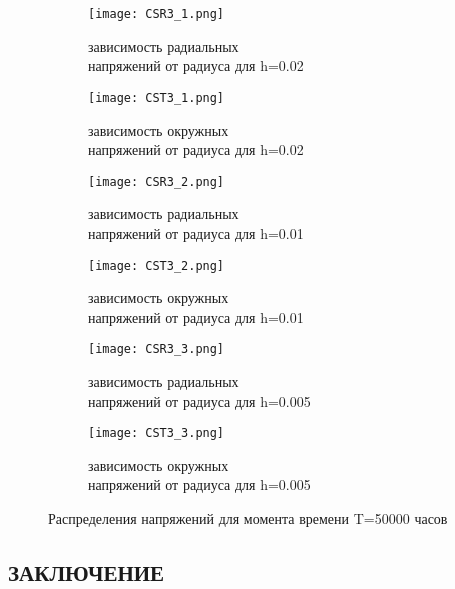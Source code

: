 \documentclass[a4paper,14pt]{extarticle}
\begin{document}
\begin{spacing}{1.0}
\begin{figure*}
\centering
\begin{subfigure}{0.45\textwidth}
\centering
\texttt{[image: CSR3\_1.png]}
\caption{зависимость радиальных \\ напряжений от радиуса для h=0.02}
\label{fig:CS3r201}
\end{subfigure}
\hfill
\begin{subfigure}{0.45\textwidth}
\centering
\texttt{[image: CST3\_1.png]}
\caption{зависимость окружных \\ напряжений от радиуса для h=0.02}
\label{fig:CS3t201}
\end{subfigure}

\vspace{25mm}

\begin{subfigure}{0.45\textwidth}
\centering
\texttt{[image: CSR3\_2.png]}
\caption{зависимость радиальных \\ напряжений от радиуса для h=0.01}
\label{fig:CS3r202}
\end{subfigure}
\hfill
\begin{subfigure}{0.45\textwidth}
\centering
\texttt{[image: CST3\_2.png]}
\caption{зависимость окружных \\ напряжений от радиуса для h=0.01}
\label{fig:CS3t202}
\end{subfigure}

\vspace{25mm}

\begin{subfigure}{0.45\textwidth}
\centering
\texttt{[image: CSR3\_3.png]}
\caption{зависимость радиальных \\ напряжений от радиуса для h=0.005}
\label{fig:CS3r203}
\end{subfigure}
\hfill
\begin{subfigure}{0.45\textwidth}
\centering
\texttt{[image: CST3\_3.png]}
\caption{зависимость окружных \\ напряжений от радиуса для h=0.005}
\label{fig:CS3t203}
\end{subfigure}
\caption{Распределения напряжений для момента времени T=50000 часов}
\label{fig:CS3}
\end{figure*}
\end{spacing}
  

\newpage

\begin{center}
\section*{\centering ЗАКЛЮЧЕНИЕ}
\end{center}
\end{document}
